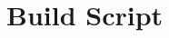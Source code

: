 \hypertarget{build-script}{%
\chapter{Build Script}\label{build-script}}

\pagebreak
\cleardoublepage
